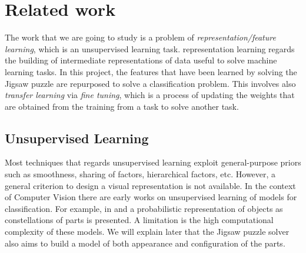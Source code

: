 \section{Related work}
The work that we are going to study is a problem of \emph{representation/feature learning}, which is an unsupervised learning task. representation learning regards the building of intermediate representations of data useful to solve machine learning tasks. In this project, the features that have been learned by solving the Jigsaw puzzle are repurposed to solve a classification problem. This involves also \emph{transfer learning} via \emph{fine tuning}, which is a process of updating the weights that are obtained from the training from a task to solve another task.

\subsection{Unsupervised Learning}
Most techniques that regards unsupervised learning exploit general-purpose priors such as smoothness, sharing of factors, hierarchical factors, etc. However, a general criterion to design a visual representation is not available. In the context of Computer Vision there are early works on unsupervised learning of models for classification. For example, in \cite{unsupervised_scale_invariant_learning} and \cite{unsupervised_learning_model_recognition} a probabilistic representation of objects as constellations of parts is presented. A limitation is the high computational complexity of these models. We will explain later that the Jigsaw puzzle solver also aims to build a model of both appearance and configuration of the parts.

